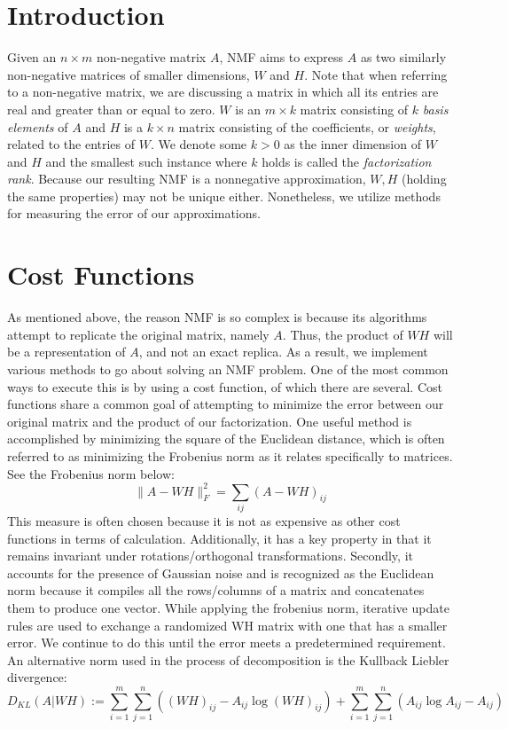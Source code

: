 \documentclass[
10pt, %
a4paper, %
oneside, %
headinclude,footinclude, %
BCOR5mm, %
]{scrartcl}
\begin{document}
\section{Introduction}
Given an $n\times m$ non-negative matrix $A$, NMF aims to express $A$ as two similarly non-negative matrices of smaller dimensions, $W$ and $H$. Note that when referring to a non-negative matrix, we are discussing a matrix in which all its entries are real and greater than or equal to zero. $W$ is an $m\times k$ matrix consisting of $k$ \textit{basis elements} of $A$ and $H$ is a $k\times n$ matrix consisting of the coefficients, or \textit{weights}, related to the entries of $W$. We denote some $k>0$ as the inner dimension of $W$ and $H$ and the smallest such instance where $k$ holds is called the \emph{factorization rank}\cite{algorithms}. Because our resulting NMF is a nonnegative approximation, $W,H$ (holding the same properties) may not be unique either. Nonetheless, we utilize methods for measuring the error of our approximations.

\section{Cost Functions}
As mentioned above, the reason NMF is so complex is because its algorithms attempt to replicate the original matrix, namely $A$. Thus, the product of $WH$ will be a representation of $A$, and not an exact replica. As a result, we implement various methods to go about solving an NMF problem. One of the most common ways to execute this is by using a cost function, of which there are several. Cost functions share a common goal of attempting to minimize the error between our original matrix and the product of our factorization.
One useful method is accomplished by minimizing the square of the Euclidean distance,  which is often referred to as minimizing the Frobenius norm as it relates specifically to matrices. See the Frobenius norm below\cite{algorithms}:
$$\lVert A-WH\rVert^{2}_{F}=\sum_{ij}(A-WH)_{ij}$$
This measure is often chosen because it is not as expensive as other cost functions in terms of calculation. Additionally, it has a key property in that it remains invariant under rotations/orthogonal transformations. Secondly, it accounts for the presence of Gaussian noise and is recognized as the Euclidean norm because it compiles all the rows/columns of a matrix and concatenates them to produce one vector.  While applying the frobenius norm, iterative update rules are used to exchange a randomized WH matrix with one that has a smaller error. We continue to do this until the error meets a predetermined requirement.
An alternative norm used in the process of decomposition is the Kullback Liebler divergence\cite{inproceedings}:
$$D_{KL}(A\vert WH):=\sum_{i=1}^{m}\sum_{j=1}^{n}((WH)_{ij}-A_{ij}\log(WH)_{ij})+\sum_{i=1}^{m}\sum_{j=1}^{n}(A_{ij}\log A_{ij}-A_{ij})$$
\end{document}
